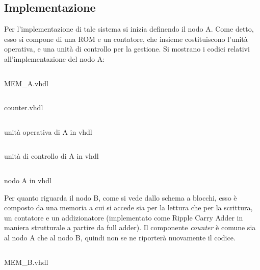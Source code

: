 \subsection{Implementazione}
Per l'implementazione di tale sistema si inizia definendo il nodo A. Come detto, esso si compone di una ROM e un contatore, che insieme costituiscono l'unità operativa, e una unità di controllo per la gestione. Si mostrano i codici relativi all'implementazione del nodo A:
\begin{code}
    \inputminted[frame=lines, framesep=2mm, baselinestretch=1.2, bgcolor=LightGray, fontsize=\footnotesize, linenos]{vhdl}{vhdl_files/handshaking/MEM_A.vhd}
    \caption{MEM\_A.vhdl}
    \label{lbl:ROMC}
\end{code}
\begin{code}
    \inputminted[frame=lines, framesep=2mm, baselinestretch=1.2, bgcolor=LightGray, fontsize=\footnotesize, linenos]{vhdl}{vhdl_files/handshaking/counter.vhd}
    \caption{counter.vhdl}
    \label{lbl:ROMC}
\end{code}
\begin{code}
    \inputminted[frame=lines, framesep=2mm, baselinestretch=1.2, bgcolor=LightGray, fontsize=\footnotesize, linenos]{vhdl}{vhdl_files/handshaking/unita_operativa.vhd}
    \caption{unità operativa di A in vhdl}
    \label{lbl:ROMC}
\end{code}
\begin{code}
    \inputminted[frame=lines, framesep=2mm, baselinestretch=1.2, bgcolor=LightGray, fontsize=\footnotesize, linenos]{vhdl}{vhdl_files/handshaking/UCA.vhd}
    \caption{unità di controllo di A in vhdl}
    \label{lbl:ROMC}
\end{code}
\begin{code}
    \inputminted[frame=lines, framesep=2mm, baselinestretch=1.2, bgcolor=LightGray, fontsize=\footnotesize, linenos]{vhdl}{vhdl_files/handshaking/nodo_A.vhd}
    \caption{nodo A in vhdl}
    \label{lbl:ROMC}
\end{code}
Per quanto riguarda il nodo B, come si vede dallo schema a blocchi, esso è composto da una memoria a cui si accede sia per la lettura che per la scrittura, un contatore e un addizionatore (implementato come Ripple Carry Adder in maniera strutturale a partire da full adder).  Il componente \textit{counter} è comune sia al nodo A che al nodo B, quindi non se ne riporterà nuovamente il codice.  
\begin{code}
    \inputminted[frame=lines, framesep=2mm, baselinestretch=1.2, bgcolor=LightGray, fontsize=\footnotesize, linenos]{vhdl}{vhdl_files/handshaking/MEM_B.vhd}
    \caption{MEM\_B.vhdl}
    \label{lbl:ROMC}
\end{code}
